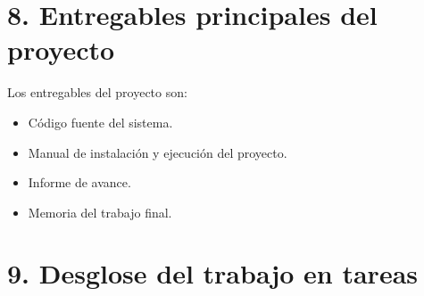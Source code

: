 \documentclass[
11pt, %
]{charter}
\begin{document}
\section{8. Entregables principales del proyecto}
\label{sec:entregables}

Los entregables del proyecto son:

\begin{itemize}
	\item Código fuente del sistema.
	\item Manual de instalación y ejecución del proyecto.
	\item Informe de avance.
	\item Memoria del trabajo final.
\end{itemize}

\section{9. Desglose del trabajo en tareas}
\label{sec:wbs}
\end{document}
